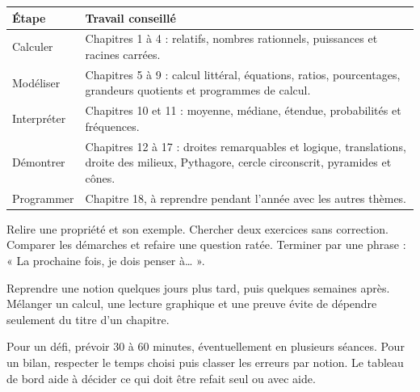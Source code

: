 \clearpage\thispagestyle{otFront}\label{parcours}\fontsize{11}{15}\selectfont

\begin{tabularx}{\linewidth}{@{}lY@{}}\toprule
Étape & Travail conseillé\\\midrule
Calculer & Chapitres 1 à 4 : relatifs, nombres rationnels, puissances et racines carrées.\\[3mm]
Modéliser & Chapitres 5 à 9 : calcul littéral, équations, ratios, pourcentages, grandeurs quotients et programmes de calcul.\\[3mm]
Interpréter & Chapitres 10 et 11 : moyenne, médiane, étendue, probabilités et fréquences.\\[3mm]
Démontrer & Chapitres 12 à 17 : droites remarquables et logique, translations, droite des milieux, Pythagore, cercle circonscrit, pyramides et cônes.\\[3mm]
Programmer & Chapitre 18, à reprendre pendant l’année avec les autres thèmes.\\\bottomrule
\end{tabularx}
\begin{savoirfaire}Relire une propriété et son exemple. Chercher deux exercices sans correction. Comparer les démarches et refaire une question ratée. Terminer par une phrase : « La prochaine fois, je dois penser à… ».\end{savoirfaire}
\begin{savoirfaire}Reprendre une notion quelques jours plus tard, puis quelques semaines après. Mélanger un calcul, une lecture graphique et une preuve évite de dépendre seulement du titre d’un chapitre.\end{savoirfaire}
Pour un défi, prévoir 30 à 60 minutes, éventuellement en plusieurs séances.
Pour un bilan, respecter le temps choisi puis classer les erreurs par notion.
Le tableau de bord aide à décider ce qui doit être refait seul ou avec aide.

\clearpage
